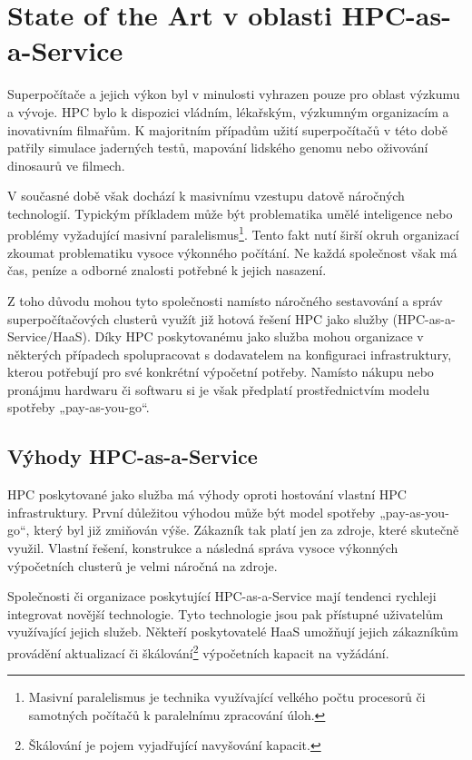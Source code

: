 \chapter{State of the Art v oblasti HPC-as-a-Service}
Superpočítače a jejich výkon byl v minulosti vyhrazen pouze pro oblast výzkumu a vývoje. HPC bylo k dispozici vládním, lékařským, výzkumným organizacím a inovativním filmařům. K majoritním případům užití superpočítačů v této době patřily simulace jaderných testů, mapování lidského genomu nebo oživování dinosaurů ve filmech.

V současné době však dochází k masivnímu vzestupu datově náročných technologií. Typickým příkladem může být problematika umělé inteligence nebo problémy vyžadující masivní paralelismus\footnote{Masivní paralelismus je technika využívající velkého počtu procesorů či samotných počítačů k paralelnímu zpracování úloh.}. Tento fakt nutí širší okruh organizací zkoumat problematiku vysoce výkonného počítání. Ne každá společnost však má čas, peníze a odborné znalosti potřebné k jejich nasazení.

Z toho důvodu mohou tyto společnosti namísto náročného sestavování a správ superpočítačových clusterů využít již hotová řešení HPC jako služby (HPC-as-a-Service/HaaS). Díky HPC poskytovanému jako služba mohou organizace v některých případech spolupracovat s dodavatelem na konfiguraci infrastruktury, kterou potřebují pro své konkrétní výpočetní potřeby. Namísto nákupu nebo pronájmu hardwaru či softwaru si je však předplatí prostřednictvím modelu spotřeby „pay-as-you-go“.\cite{Rand20201203}

\section{Výhody HPC-as-a-Service}
HPC poskytované jako služba má výhody oproti hostování vlastní HPC infrastruktury. První důležitou výhodou může být model spotřeby „pay-as-you-go“, který byl již zmiňován výše. Zákazník tak platí jen za zdroje, které skutečně využil. Vlastní řešení, konstrukce a následná správa vysoce výkonných výpočetních clusterů je velmi náročná na zdroje.

Společnosti či organizace poskytující HPC-as-a-Service mají tendenci rychleji integrovat novější technologie. Tyto technologie jsou pak přístupné uživatelům využívající jejich služeb. Někteří poskytovatelé HaaS umožňují jejich zákazníkům provádění aktualizací či škálování\footnote{Škálování je pojem vyjadřující navyšování kapacit.} výpočetních kapacit na vyžádání. \cite{Wiggers20220120}


